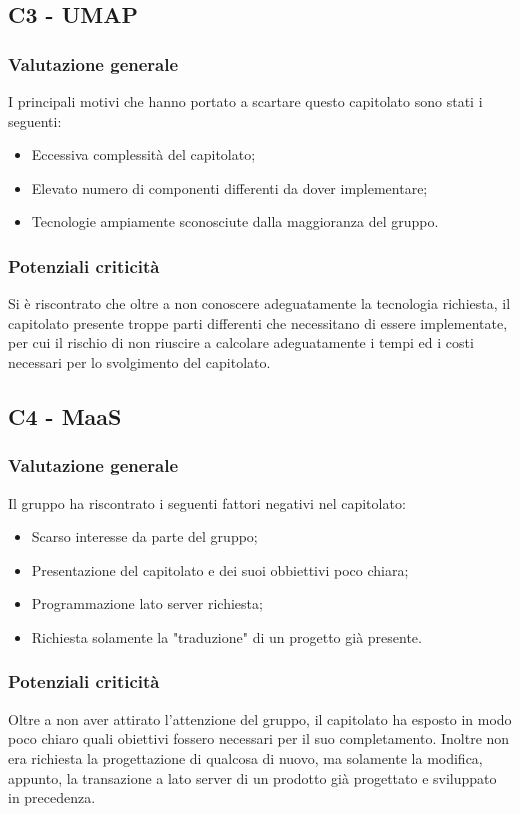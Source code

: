 \documentclass[a4paper]{article}
\begin{document}
		\subsection{C3 - UMAP}
			\subsubsection{Valutazione generale}
				I principali motivi che hanno portato a scartare questo capitolato sono stati i seguenti:
				\begin{itemize}
					\item Eccessiva complessità del capitolato;
					\item Elevato numero di componenti differenti da dover implementare;
					\item Tecnologie ampiamente sconosciute dalla maggioranza del gruppo.
				\end{itemize}
			\subsubsection{Potenziali criticità}
				Si è riscontrato che oltre a non conoscere adeguatamente la tecnologia richiesta, il capitolato presente troppe parti differenti 
				che necessitano di essere implementate, per cui il rischio di non riuscire a calcolare adeguatamente i tempi ed i costi necessari 
				per lo svolgimento del capitolato. 
				
		\subsection{C4 - MaaS}
			\subsubsection{Valutazione generale}
				Il gruppo ha riscontrato i seguenti fattori negativi nel capitolato:
				\begin{itemize}
					\item Scarso interesse da parte del gruppo;
					\item Presentazione del capitolato e dei suoi obbiettivi poco chiara;
					\item Programmazione lato server richiesta;
					\item Richiesta solamente la "traduzione" di un progetto già presente.
				\end{itemize}
			\subsubsection{Potenziali criticità}
				Oltre a non aver attirato l'attenzione del gruppo, il capitolato ha esposto in modo poco chiaro quali obiettivi fossero necessari per 
				il suo completamento. Inoltre non era richiesta la progettazione di qualcosa di nuovo, ma solamente la modifica, appunto, la transazione 
				a lato server di un prodotto già progettato e sviluppato in precedenza.
				
\end{document}
